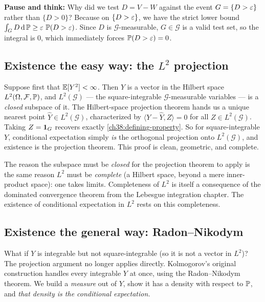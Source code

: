 \begin{recoverybox}
\textbf{Pause and think:} Why did we test $D = V - W$ against the event $G = \{D > \eps\}$ rather than $\{D > 0\}$? Because on $\{D > \eps\}$, we have the strict lower bound $\int_G D\,\dd\P \ge \eps\,\P(D > \eps)$. Since $D$ is $\mathcal{G}$-measurable, $G \in \mathcal{G}$ is a valid test set, so the integral is 0, which immediately forces $\P(D > \eps) = 0$.
\end{recoverybox}

\subsection{Existence the easy way: the \texorpdfstring{$L^2$}{L2} projection}
\label{ch38:existence-l2}

Suppose first that $\E[Y^2] < \infty$. Then $Y$ is a vector in the Hilbert space $L^2(\Omega,
\mathcal{F}, \P)$, and $L^2(\mathcal{G})$ --- the square-integrable $\mathcal{G}$-measurable
variables --- is a \emph{closed} subspace of it. The Hilbert-space projection theorem hands us a
unique nearest point $\hat Y \in L^2(\mathcal{G})$, characterized by $\langle Y - \hat Y, Z\rangle =
0$ for all $Z \in L^2(\mathcal{G})$. Taking $Z = \ind_G$ recovers exactly
\eqref{ch38:defining-property}. So for square-integrable $Y$, conditional expectation simply
\emph{is} the orthogonal projection onto $L^2(\mathcal{G})$, and existence is the projection theorem.
This proof is clean, geometric, and complete.

\begin{happeningbox}
The reason the subspace must be \emph{closed} for the projection theorem to apply is the same reason
$L^2$ must be \emph{complete} (a Hilbert space, beyond a mere inner-product space): one takes limits.
Completeness of $L^2$ is itself a consequence of the dominated convergence theorem from the Lebesgue
integration chapter. The existence of conditional expectation in $L^2$ rests on this completeness.
\end{happeningbox}

\subsection{Existence the general way: Radon--Nikodym}
\label{ch38:existence-rn}

What if $Y$ is integrable but not square-integrable (so it is not a vector in $L^2$)? The projection
argument no longer applies directly. Kolmogorov's original construction handles every integrable $Y$
at once, using the Radon--Nikodym theorem. We build a \emph{measure} out of $Y$,
show it has a density with respect to $\P$, and \emph{that density is the conditional expectation.}

